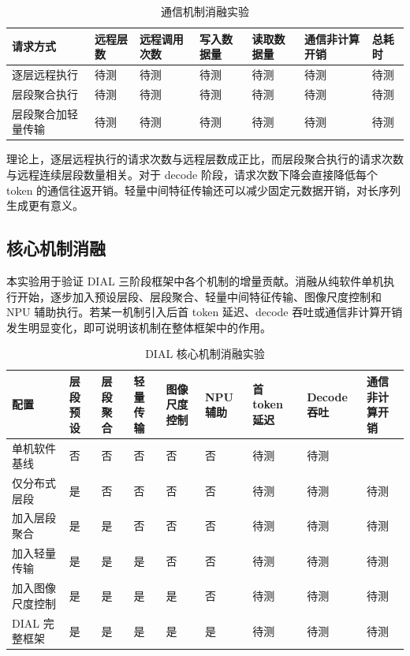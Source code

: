 \documentclass[10pt,a4paper,twocolumn]{ctexart}
\begin{document}
\begin{table}[t]
\centering
\caption{通信机制消融实验}
\scriptsize
\begin{tabularx}{\textwidth}{@{}>{\raggedright\arraybackslash}X >{\raggedright\arraybackslash}X >{\raggedright\arraybackslash}X >{\raggedright\arraybackslash}X >{\raggedright\arraybackslash}X >{\raggedright\arraybackslash}X >{\raggedright\arraybackslash}X@{}}
\toprule
请求方式 & 远程层数 & 远程调用次数 & 写入数据量 & 读取数据量 & 通信非计算开销 & 总耗时 \\
\midrule
逐层远程执行 & 待测 & 待测 & 待测 & 待测 & 待测 & 待测 \\
层段聚合执行 & 待测 & 待测 & 待测 & 待测 & 待测 & 待测 \\
层段聚合加轻量传输 & 待测 & 待测 & 待测 & 待测 & 待测 & 待测 \\
\bottomrule
\end{tabularx}
\end{table}

理论上，逐层远程执行的请求次数与远程层数成正比，而层段聚合执行的请求次数与远程连续层段数量相关。对于 decode 阶段，请求次数下降会直接降低每个 token 的通信往返开销。轻量中间特征传输还可以减少固定元数据开销，对长序列生成更有意义。

\subsection{核心机制消融}

本实验用于验证 DIAL 三阶段框架中各个机制的增量贡献。消融从纯软件单机执行开始，逐步加入预设层段、层段聚合、轻量中间特征传输、图像尺度控制和 NPU 辅助执行。若某一机制引入后首 token 延迟、decode 吞吐或通信非计算开销发生明显变化，即可说明该机制在整体框架中的作用。

\begin{table}[t]
\centering
\caption{DIAL 核心机制消融实验}
\scriptsize
\begin{tabularx}{\textwidth}{@{}>{\raggedright\arraybackslash}X >{\raggedright\arraybackslash}X >{\raggedright\arraybackslash}X >{\raggedright\arraybackslash}X >{\raggedright\arraybackslash}X >{\raggedright\arraybackslash}X >{\raggedright\arraybackslash}X >{\raggedright\arraybackslash}X >{\raggedright\arraybackslash}X@{}}
\toprule
配置 & 层段预设 & 层段聚合 & 轻量传输 & 图像尺度控制 & NPU 辅助 & 首 token 延迟 & Decode 吞吐 & 通信非计算开销 \\
\midrule
单机软件基线 & 否 & 否 & 否 & 否 & 否 & 待测 & 待测 & 0 \\
仅分布式层段 & 是 & 否 & 否 & 否 & 否 & 待测 & 待测 & 待测 \\
加入层段聚合 & 是 & 是 & 否 & 否 & 否 & 待测 & 待测 & 待测 \\
加入轻量传输 & 是 & 是 & 是 & 否 & 否 & 待测 & 待测 & 待测 \\
加入图像尺度控制 & 是 & 是 & 是 & 是 & 否 & 待测 & 待测 & 待测 \\
DIAL 完整框架 & 是 & 是 & 是 & 是 & 是 & 待测 & 待测 & 待测 \\
\bottomrule
\end{tabularx}
\end{table}
\end{document}

